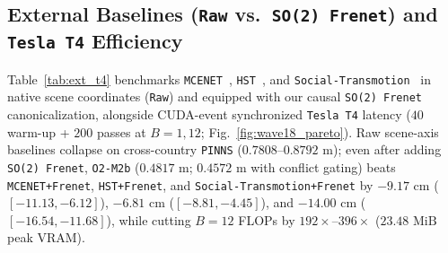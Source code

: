 \documentclass[journal]{IEEEtran}
\begin{document}
\subsection{External Baselines (\texttt{Raw} vs.\ \texttt{SO(2) Frenet}) and \texttt{Tesla T4} Efficiency}
Table~\ref{tab:ext_t4} benchmarks \texttt{MCENET}~\cite{cheng2020mcenet}, \texttt{HST}~\cite{salzmann2023hst}, and \texttt{Social-Transmotion}~\cite{saadatnejad2024transmotion} in native scene coordinates (\texttt{Raw}) and equipped with our causal \texttt{SO(2) Frenet} canonicalization, alongside CUDA-event synchronized \texttt{Tesla T4} latency ($40$ warm-up + $200$ passes at $B=1, 12$; Fig.~\ref{fig:wave18_pareto}). Raw scene-axis baselines collapse on cross-country \texttt{PINNS} ($0.7808\text{--}0.8792\text{ m}$); even after adding \texttt{SO(2) Frenet}, \texttt{O2-M2b} ($0.4817\text{ m}$; $0.4572\text{ m}$ with conflict gating) beats \texttt{MCENET+Frenet}, \texttt{HST+Frenet}, and \texttt{Social-Transmotion+Frenet} by $-9.17\text{ cm}$ ($[-11.13, -6.12]$), $-6.81\text{ cm}$ ($[-8.81, -4.45]$), and $-14.00\text{ cm}$ ($[-16.54, -11.68]$), while cutting $B=12$ FLOPs by $192\times\text{--}396\times$ ($23.48\text{ MiB}$ peak VRAM).
\end{document}
